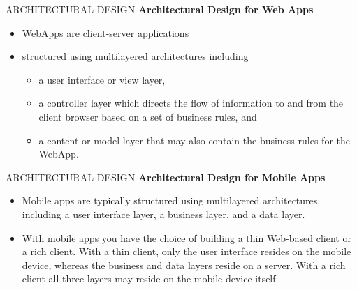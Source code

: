 \documentclass{beamer}
\begin{document}
\begin{frame}{ARCHITECTURAL DESIGN}
	\textbf{Architectural Design for Web Apps}
	\begin{itemize}
		\item WebApps are client-server applications
		\item structured using multilayered 
		architectures
		 including \begin{itemize}
		 	\item a user interface or view layer, 
		 	\item a controller layer which directs the 
		 	flow of information to and from the client browser based on a set of business rules, and 
		 	\item a 
		 	content or model layer that may also contain the business rules for the WebApp.

		 \end{itemize}
	\end{itemize}
\end{frame}

\begin{frame}{ARCHITECTURAL DESIGN}
	\textbf{Architectural Design for Mobile Apps}
	\begin{itemize}
		\item Mobile apps are typically structured using multilayered architectures, including a user 
		interface layer, a business layer, and a data layer. 
		\item With mobile apps you have the choice of 
		building a thin Web-based client or a rich client. With a thin client, only the user interface 
		resides on the mobile device, whereas the business and data layers reside on a server. With 
		a rich client all three layers may reside on the mobile device itself.

		\end{itemize}
\end{frame}
\end{document}
